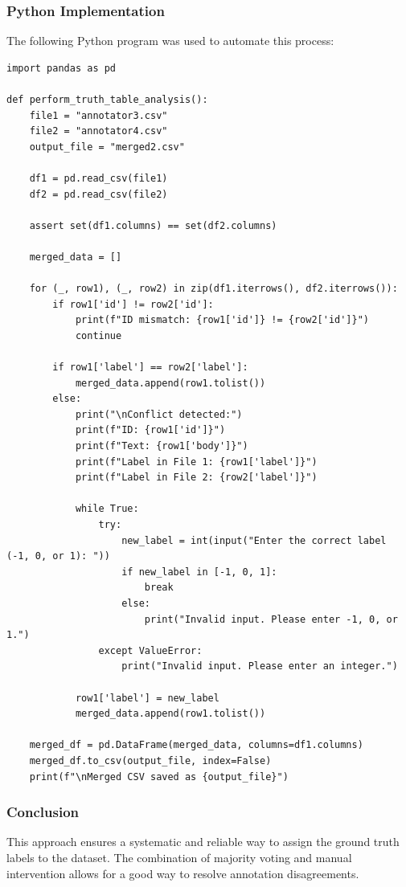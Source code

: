 \documentclass{article}
\begin{document}
\subsubsection*{Python Implementation}

The following Python program was used to automate this process:

\begin{verbatim}
import pandas as pd
    
def perform_truth_table_analysis():
    file1 = "annotator3.csv"
    file2 = "annotator4.csv"
    output_file = "merged2.csv"
    
    df1 = pd.read_csv(file1)
    df2 = pd.read_csv(file2)
    
    assert set(df1.columns) == set(df2.columns)
    
    merged_data = []
    
    for (_, row1), (_, row2) in zip(df1.iterrows(), df2.iterrows()):
        if row1['id'] != row2['id']:
            print(f"ID mismatch: {row1['id']} != {row2['id']}")
            continue
    
        if row1['label'] == row2['label']:
            merged_data.append(row1.tolist())
        else:
            print("\nConflict detected:")
            print(f"ID: {row1['id']}")
            print(f"Text: {row1['body']}")
            print(f"Label in File 1: {row1['label']}")
            print(f"Label in File 2: {row2['label']}")
    
            while True:
                try:
                    new_label = int(input("Enter the correct label (-1, 0, or 1): "))
                    if new_label in [-1, 0, 1]:
                        break
                    else:
                        print("Invalid input. Please enter -1, 0, or 1.")
                except ValueError:
                    print("Invalid input. Please enter an integer.")
    
            row1['label'] = new_label
            merged_data.append(row1.tolist())
    
    merged_df = pd.DataFrame(merged_data, columns=df1.columns)
    merged_df.to_csv(output_file, index=False)
    print(f"\nMerged CSV saved as {output_file}")
\end{verbatim}
    

\subsubsection*{Conclusion}

This approach ensures a systematic and reliable way to assign the ground truth labels to the dataset. The 
combination of majority voting and manual intervention allows for a good way to resolve annotation disagreements.
\end{document}
